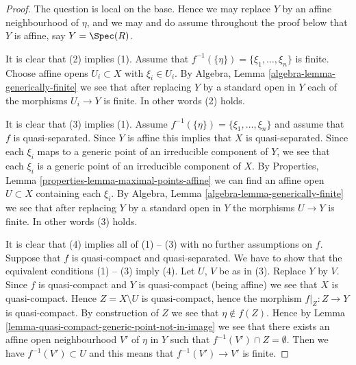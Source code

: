 \begin{proof}
The question is local on the base. Hence we may replace $Y$ by an
affine neighbourhood of $\eta$, and we may and do assume throughout
the proof below that $Y$ is affine, say $Y = \Spec(R)$.

\medskip\noindent
It is clear that (2) implies (1).
Assume that $f^{-1}(\{\eta\}) = \{\xi_1, \ldots, \xi_n\}$ is finite.
Choose affine opens $U_i \subset X$ with $\xi_i \in U_i$.
By Algebra, Lemma \ref{algebra-lemma-generically-finite} we see
that after replacing $Y$ by a standard open in
$Y$ each of the morphisms $U_i \to Y$ is finite.
In other words (2) holds.

\medskip\noindent
It is clear that (3) implies (1).
Assume $f^{-1}(\{\eta\}) = \{\xi_1, \ldots, \xi_n\}$ and assume
that $f$ is quasi-separated.
Since $Y$ is affine this implies that $X$ is quasi-separated.
Since each $\xi_i$ maps to a generic point of an irreducible component
of $Y$, we see that each $\xi_i$ is a generic point of an irreducible
component of $X$.
By Properties, Lemma \ref{properties-lemma-maximal-points-affine}
we can find an affine open $U \subset X$ containing each $\xi_i$.
By Algebra, Lemma \ref{algebra-lemma-generically-finite} we see
that after replacing $Y$ by a standard open in
$Y$ the morphisms $U \to Y$ is finite.
In other words (3) holds.

\medskip\noindent
It is clear that (4) implies all of (1) -- (3) with no further assumptions
on $f$. Suppose that $f$ is quasi-compact and quasi-separated. We have to
show that the equivalent conditions (1) -- (3) imply (4).
Let $U$, $V$ be as in (3). Replace $Y$ by $V$. Since $f$ is quasi-compact
and $Y$ is quasi-compact (being affine) we see that $X$ is quasi-compact.
Hence $Z = X \setminus U$ is quasi-compact, hence the morphism
$f|_Z : Z \to Y$ is quasi-compact. By construction of $Z$ we see that
$\eta \not \in f(Z)$. Hence by
Lemma \ref{lemma-quasi-compact-generic-point-not-in-image}
we see that there exists an affine open
neighbourhood $V'$ of $\eta$ in $Y$ such that $f^{-1}(V') \cap Z = \emptyset$.
Then we have $f^{-1}(V') \subset U$ and this means
that $f^{-1}(V') \to V'$ is finite.
\end{proof}

